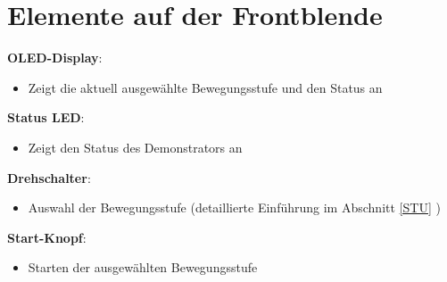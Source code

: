 %
%

\chapter{Elemente auf der Frontblende}
\begin{figure}[htb]
\begin{center}
	
	\label{Frontblende}
\end{center}
\end{figure}

	\textbf{OLED-Display}: 
\begin{itemize}
	\item Zeigt die aktuell ausgewählte Bewegungsstufe und den Status an
\end{itemize}

	\textbf{Status LED}: 
\begin{itemize}
	\item Zeigt den Status des Demonstrators an
\end{itemize}

	\textbf{Drehschalter}: 
\begin{itemize}
	\item Auswahl der Bewegungsstufe (detaillierte Einführung im Abschnitt \ref{STU} )
\end{itemize}

	\textbf{Start-Knopf}: 
\begin{itemize}
	\item Starten der ausgewählten Bewegungsstufe
\end{itemize}
